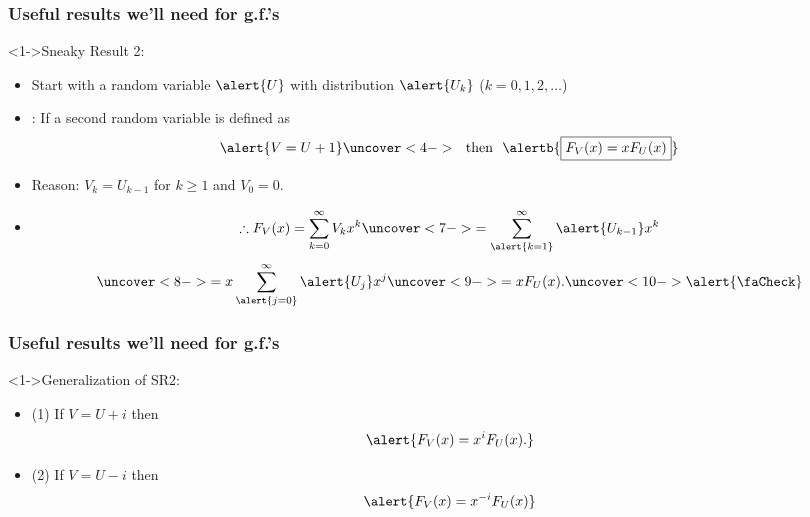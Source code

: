 \begin{frame}[label=rn-sneakyresult2]
  \frametitle{Useful results we'll need for g.f.'s}

  \begin{block}<1->{Sneaky Result 2:}
    \begin{itemize}
    \item<2->
      Start with a random variable $\alert{U}$ with
      distribution $\alert{U_k}$ ($k=0,1,2,\dots$)
    \item<3-> 
      : If a second random variable
      is defined as 
      $$
      \alert{ V = U + 1}
      \uncover<4->{
        \mbox{\ \ then \ }
        \alertb{
        \boxed{F_{V}(x) = xF_{U}(x)}
        }
      }
      $$
    \item<5->
      \alert{Reason:} $V_{k} = U_{k-1}$ for $k \ge 1$ and $V_{0}=0$.
    \item<6->
      $$
      \therefore 
      F_{V}(x)
      = 
      \sum_{k=0}^{\infty} V_k x^k
      \uncover<7->{
        =
        \sum_{\alert{k=1}}^{\infty} \alert{U_{k-1}} x^k
      }
      $$
      $$
      \uncover<8->{
        =
        x \sum_{\alert{j=0}}^{\infty} \alert{U_{j}} x^j
      }
      \uncover<9->{
        =
        x F_U(x).
      }
      \uncover<10->{
        \alert{\faCheck}
      }
      $$
    \end{itemize}
  \end{block}

\end{frame}

\begin{frame}
  \frametitle{Useful results we'll need for g.f.'s}

  \begin{block}<1->{Generalization of SR2:}
    \begin{itemize}
    \item<2->
    (1) If $V=U+i$ then
    $$
    \alert{F_V(x) = x^i F_U(x).}
    $$
    \item<3->
    (2) If $V=U-i$ then
     $$
     \alert{
       F_V(x) = x^{-i} F_U(x)
     }
     $$
    \end{itemize}
  \end{block}

\end{frame}

